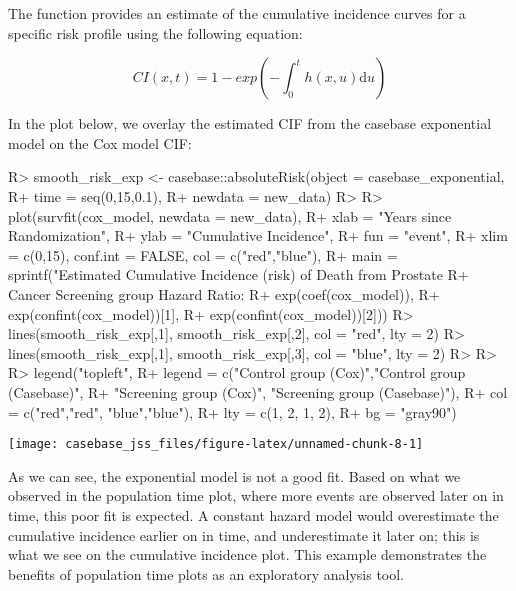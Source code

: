 \documentclass[article]{jss}
\begin{document}
The  function provides an estimate of the cumulative
incidence curves for a specific risk profile using the following
equation:

\[ CI(x, t) = 1 - exp\left( - \int_0^t h(x, u) \textrm{d}u \right) \]

In the plot below, we overlay the estimated CIF from the casebase
exponential model on the Cox model CIF:

\begin{CodeChunk}

\begin{CodeInput}
R> smooth_risk_exp <- casebase::absoluteRisk(object = casebase_exponential, 
R+                                           time = seq(0,15,0.1), 
R+                                           newdata = new_data)
R> 
R> plot(survfit(cox_model, newdata = new_data),
R+      xlab = "Years since Randomization", 
R+      ylab = "Cumulative Incidence", 
R+      fun = "event",
R+      xlim = c(0,15), conf.int = FALSE, col = c("red","blue"), 
R+      main = sprintf("Estimated Cumulative Incidence (risk) of Death from Prostate 
R+                     Cancer Screening group Hazard Ratio: %
R+                     exp(coef(cox_model)), 
R+                     exp(confint(cox_model))[1], 
R+                     exp(confint(cox_model))[2]))
R> lines(smooth_risk_exp[,1], smooth_risk_exp[,2], col = "red", lty = 2)
R> lines(smooth_risk_exp[,1], smooth_risk_exp[,3], col = "blue", lty = 2)
R> 
R> 
R> legend("topleft", 
R+        legend = c("Control group (Cox)","Control group (Casebase)",
R+                   "Screening group (Cox)", "Screening group (Casebase)"), 
R+        col = c("red","red", "blue","blue"),
R+        lty = c(1, 2, 1, 2), 
R+        bg = "gray90")
\end{CodeInput}


\begin{center}\texttt{[image: casebase\_jss\_files/figure-latex/unnamed-chunk-8-1]} \end{center}

\end{CodeChunk}

As we can see, the exponential model is not a good fit. Based on what we
observed in the population time plot, where more events are observed
later on in time, this poor fit is expected. A constant hazard model
would overestimate the cumulative incidence earlier on in time, and
underestimate it later on; this is what we see on the cumulative
incidence plot. This example demonstrates the benefits of population
time plots as an exploratory analysis tool.
\end{document}

